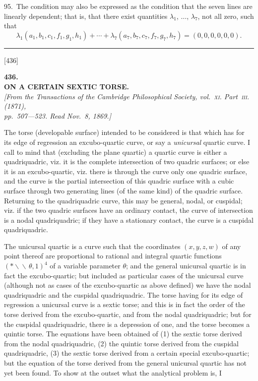 \documentclass[12pt,a4paper]{article}
\newcommand{\paperref}[1]{\textup{[#1]}}
\theoremstyle{definition}
\begin{document}
95.~The condition may also be expressed as the condition that the seven lines are linearly dependent; that is, that there exist quantities $\lambda_1$, $\ldots$, $\lambda_7$, not all zero, such that
\[
\lambda_1 (a_1, b_1, c_1, f_1, g_1, h_1) + \cdots + \lambda_7 (a_7, b_7, c_7, f_7, g_7, h_7) = (0, 0, 0, 0, 0, 0).
\]

\bigskip
\noindent\rule{\textwidth}{0.4pt}

\newpage
\setcounter{page}{99}

\noindent\paperref{436}\quad
\begin{center}
\textbf{436.}\\[6pt]
\textbf{ON A CERTAIN SEXTIC TORSE.}\\[4pt]
\small
\textit{[From the \textit{Transactions of the Cambridge Philosophical Society}, vol.~\textsc{xi}. Part~\textsc{iii}. (1871),\\
pp.~507---523. Read Nov.~8, 1869.]}
\end{center}

\normalsize
\setlength{\parindent}{1em}
The torse (developable surface) intended to be considered is that which has for its edge of regression an excubo-quartic curve, or say a \textit{unicursal} quartic curve. I call to mind that (excluding the plane quartic) a quartic curve is either a quadriquadric, viz. it is the complete intersection of two quadric surfaces; or else it is an excubo-quartic, viz. there is through the curve only one quadric surface, and the curve is the partial intersection of this quadric surface with a cubic surface through two generating lines (of the same kind) of the quadric surface. Returning to the quadriquadric curve, this may be general, nodal, or cuspidal; viz. if the two quadric surfaces have an ordinary contact, the curve of intersection is a nodal quadriquadric; if they have a stationary contact, the curve is a cuspidal quadriquadric.

The unicursal quartic is a curve such that the coordinates $(x, y, z, w)$ of any point thereof are proportional to rational and integral quartic functions $(*\!\!\backslash\!\!\backslash\, \theta, 1)^4$ of a variable parameter $\theta$; and the general unicursal quartic is in fact the excubo-quartic; but included as particular cases of the unicursal curve (although not as cases of the excubo-quartic as above defined) we have the nodal quadriquadric and the cuspidal quadriquadric. The torse having for its edge of regression a unicursal curve is a sextic torse; and this is in fact the order of the torse derived from the excubo-quartic, and from the nodal quadriquadric; but for the cuspidal quadriquadric, there is a depression of one, and the torse becomes a quintic torse. The equations have been obtained of (1) the sextic torse derived from the nodal quadriquadric, (2) the quintic torse derived from the cuspidal quadriquadric, (3) the sextic torse derived from a certain special excubo-quartic; but the equation of the torse derived from the general unicursal quartic has not yet been found. To show at the outset what the analytical problem is, I
\end{document}
